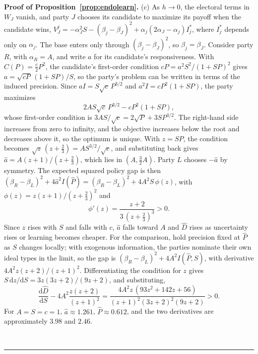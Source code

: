 \documentclass[12pt,letterpaper]{article}
\newenvironment{proof}[1][Proof]{\noindent\textbf{#1.} }{\ \rule{0.5em}{0.5em}}
\begin{document}
\begin{proof}[Proof of Proposition~\ref{prop:endolearn}]
(c) As $h\to0$, the electoral terms in $W_J$ vanish, and party $J$ chooses its candidate to maximize its payoff when the candidate wins, $V_J^j=-\alpha_J^2S-(\beta_j-\beta_J)^2+\alpha_j(2\alpha_J-\alpha_j)I_j^*$, where $I_j^*$ depends only on $\alpha_j$. The base enters only through $(\beta_j-\beta_J)^2$, so $\beta_j=\beta_J$. Consider party $R$, with $\alpha_R=A$, and write $a$ for its candidate's responsiveness. With $C(P)=\tfrac c2P^2$, the candidate's first-order condition $cP=a^2S^2/(1+SP)^2$ gives $a=\sqrt{cP}\,(1+SP)/S$, so the party's problem can be written in terms of the induced precision. Since $aI=S\sqrt c\,P^{3/2}$ and $a^2I=cP^2(1+SP)$, the party maximizes
\[
2AS\sqrt c\,P^{3/2}-cP^2(1+SP),
\]
whose first-order condition is $3AS/\sqrt c=2\sqrt P+3SP^{3/2}$. The right-hand side increases from zero to infinity, and the objective increases below the root and decreases above it, so the optimum is unique. With $z=SP$, the condition becomes $\sqrt z\,(z+\tfrac23)=AS^{3/2}/\sqrt c$, and substituting back gives $\widehat a=A(z+1)/(z+\tfrac23)$, which lies in $(A,\tfrac32A)$. Party $L$ chooses $-\widehat a$ by symmetry. The expected squared policy gap is then $(\beta_R-\beta_L)^2+4\widehat a^2I(\widehat P)=(\beta_R-\beta_L)^2+4A^2S\,\phi(z)$, with $\phi(z)=z(z+1)/(z+\tfrac23)^2$ and
\[
\phi'(z)=\frac{z+2}{3\,(z+\tfrac23)^3}>0 .
\]
Since $z$ rises with $S$ and falls with $c$, $\widehat a$ falls toward $A$ and $\widehat D$ rises as uncertainty rises or learning becomes cheaper. For the comparison, hold precision fixed at $\widehat P$ as $S$ changes locally; with exogenous information, the parties nominate their own ideal types in the limit, so the gap is $(\beta_R-\beta_L)^2+4A^2I(\widehat P,S)$, with derivative $4A^2z(z+2)/(z+1)^2$. Differentiating the condition for $z$ gives $S\,\mathrm{d}z/\mathrm{d}S=3z(3z+2)/(9z+2)$, and substituting,
\[
\frac{\mathrm{d}\widehat D}{\mathrm{d}S}-4A^2\frac{z(z+2)}{(z+1)^2}=\frac{4A^2z\,(93z^2+142z+56)}{(z+1)^2(3z+2)^2(9z+2)}>0 .
\]
For $A=S=c=1$, $\widehat a\approx1.261$, $\widehat P\approx0.612$, and the two derivatives are approximately $3.98$ and $2.46$.



\end{proof}
\end{document}
